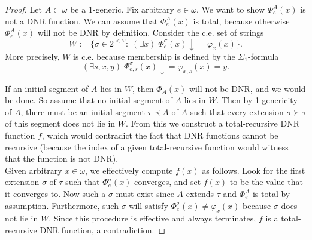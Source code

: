\documentclass{article}
\begin{document}
\begin{enumerate}
    \begin{proof}
      Let $A\subset\omega$ be a 1-generic. Fix arbitrary $e\in\omega$. We
      want to show $\Phi^A_e(x)$ is not a DNR function. We can assume that
      $\Phi^A_e(x)$ is total, because otherwise $\Phi^A_e(x)$ will not be
      DNR by definition. Consider the c.e. set of strings
      \[W :=\{\sigma\in2^{<\omega}:\; (\exists x)\;
      \Phi_e^\sigma(x) \downarrow= \varphi_x(x)\}.\]
      More precisely, $W$ is c.e. because membership is defined
      by the $\Sigma_1$-formula
      \[(\exists s,x,y)\; \Phi_{e,s}^\sigma(x) \downarrow=
      \varphi_{x,s}(x)=y.\]

      If an initial segment of $A$ lies in $W$, then $\Phi_A(x)$ will not
      be DNR, and we would be done. So assume that no initial segment of
      $A$ lies in $W$. Then by 1-genericity of $A$, there must be an
      initial segment $\tau\prec A$ of $A$ such that every extension
      $\sigma\succ\tau$ of this segment does not lie in
      $W$. From this we construct a total-recursive DNR function $f$,
      which would contradict the fact that DNR functions cannot be
      recursive (because the index of a given total-recursive function
      would witness that the function is not DNR). \\

      Given arbitrary $x\in\omega$, we effectively
      compute $f(x)$ as follows. Look for the first extension $\sigma$ of
      $\tau$ such that $\Phi^\sigma_e(x)$ converges, and set $f(x)$ to be
      the value that it converges to. Now such a $\sigma$ must exist
      since $A$ extends $\tau$ and $\Phi^A_e$ is total by assumption.
      Furthermore, such $\sigma$ will satisfy
      $\Phi^\sigma_e(x)\neq\varphi_x(x)$ because $\sigma$ does not lie in
      $W$. Since this procedure is effective and always terminates, $f$ is
      a total-recursive DNR function, a contradiction.
    \end{proof}
\end{enumerate}
\end{document}

